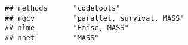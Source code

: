 \documentclass[]{book}
\begin{document}
\begin{verbatim}
## methods      "codetools"                                                                                                                                                                                                                                                                                                                                                                                                                                                                                                                                                                                                                                                                                               
## mgcv         "parallel, survival, MASS"                                                                                                                                                                                                                                                                                                                                                                                                                                                                                                                                                                                                                                                                                
## nlme         "Hmisc, MASS"                                                                                                                                                                                                                                                                                                                                                                                                                                                                                                                                                                                                                                                                                             
## nnet         "MASS"                                                                                                                                                                                                                                                                                                                                                                                                                                                                                                                                                                                                                                                                                                    

\end{verbatim}
\end{document}
